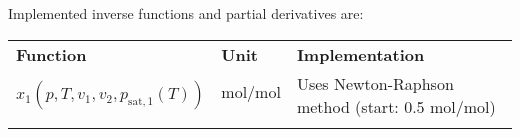 %
Implemented inverse functions and partial derivatives are:
%
\begin{longtable}[l]{l|l|p{7.5cm}}
	\toprule
	\addlinespace
	\textbf{Function} & \textbf{Unit} &	\textbf{Implementation} \\
	\addlinespace
	\midrule
	\endhead
	
	\bottomrule
	\endfoot
	\bottomrule
	\endlastfoot
	\addlinespace
	
	$x_1(p,T,v_1,v_2,p_\mathrm{sat,1}(T))$& $\si{\mole\per\mole}$ & Uses Newton-Raphson method (start: 0.5 $\si{\mole\per\mole}$) \\
	
	\addlinespace
\end{longtable}
%
